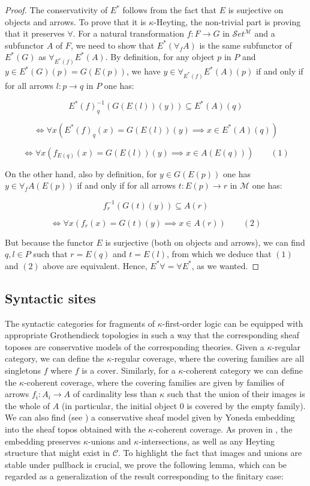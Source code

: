 \documentclass[a4paper,11pt]{article}
\theoremstyle{plain}
\theoremstyle{plain}
\theoremstyle{remark}
\begin{document}
\begin{proof}
 The conservativity of $E^*$ follows from the fact that $E$ is surjective on objects and arrows. To prove that it is $\kappa$-Heyting, the non-trivial part is proving that it preserves $\forall$. For a natural transformation $f: F \to G$ in $\mathcal{S}et^{\mathcal{M}}$ and a subfunctor $A$ of $F$, we need to show that $E^*(\forall_fA)$ is the same subfunctor of $E^*(G)$ as $\forall_{E^*(f)}E^*(A)$. By definition, for any object $p$ in $P$ and $y \in E^*(G)(p)=G(E(p))$, we have $y \in \forall_{E^*(f)}E^*(A)(p)$ if and only if for all arrows $l: p \to q$ in $P$ one has:

$$E^*(f)_q^{-1}(G(E(l))(y)) \subseteq E^*(A)(q)$$

$$\iff \forall x (E^*(f)_q(x)=G(E(l))(y) \implies x \in E^*(A)(q))$$

$$\iff \forall x (f_{E(q)}(x)=G(E(l))(y) \implies x \in A(E(q))) \qquad (1)$$

On the other hand, also by definition, for $y \in G(E(p))$ one has $y \in \forall_fA(E(p))$ if and only if for all arrows $t: E(p) \to r$ in $\mathcal{M}$ one has:

$$f_r^{-1}(G(t)(y)) \subseteq A(r)$$

$$\iff \forall x (f_r(x)=G(t)(y) \implies x \in A(r)) \qquad (2)$$

But because the functor $E$ is surjective (both on objects and arrows), we can find $q, l \in P$ such that $r=E(q)$ and $t=E(l)$, from which we deduce that $(1)$ and $(2)$ above are equivalent. Hence, $E^* \forall=\forall E^*$, as we wanted.
 
\end{proof}

\subsection{Syntactic sites}

The syntactic categories for fragments of $\kappa$-first-order logic can be equipped with appropriate Grothendieck topologies in such a way that the corresponding sheaf toposes are conservative models of the corresponding theories. Given a $\kappa$-regular category, we can define the $\kappa$-regular coverage, where the covering families are all singletons $f$ where $f$ is a cover. Similarly, for a $\kappa$-coherent category we can define the $\kappa$-coherent coverage, where the covering families are given by families of arrows $f_i: A_i \to A$ of cardinality less than $\kappa$ such that the union of their images is the whole of $A$ (in particular, the initial object $0$ is covered by the empty family). We can also find (see \cite{bj}) a conservative sheaf model given by Yoneda embedding into the sheaf topos obtained with the $\kappa$-coherent coverage. As proven in \cite{bj}, the embedding preserves $\kappa$-unions and $\kappa$-intersections, as well as any Heyting structure that might exist in $\mathcal{C}$. To highlight the fact that images and unions are stable under pullback is crucial, we prove the following lemma, which can be regarded as a generalization of the result corresponding to the finitary case:
\end{document}
